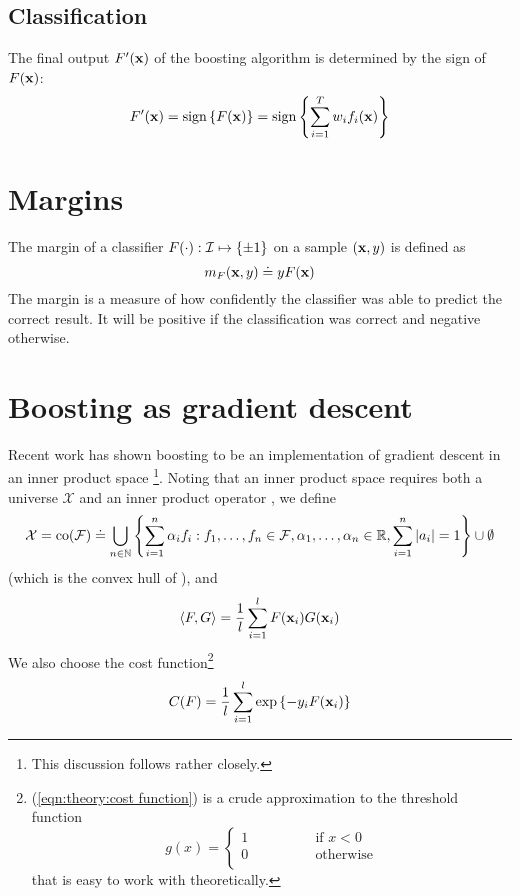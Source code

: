 \subsection{Classification}
The final output $F'(\mathbf{x})$ of the boosting algorithm is determined by
the sign of $F(\mathbf{x})$:
\begin{equation}
F'(\mathbf{x}) = \mathrm{sign} \left\{ F(\mathbf{x}) \right\} = \mathrm{sign} \left\{ \sum_{i=1}^T
w_i f_i(\mathbf{x}) \right\}
\label{eqn:output}
\end{equation}

\section{Margins}

The margin of a classifier $F(\cdot) : \mathcal{I} \mapsto \{\pm 1\}$ on a
sample $(\mathbf{x}, y)$ is defined as
%
\begin{equation}
m_F(\mathbf{x}, y) \doteq y F(\mathbf{x})
\end{equation}
%
The margin is a measure of how confidently the classifier was able to
predict the correct result.  It will be positive if the classification
was correct and negative otherwise.

\section{Boosting as gradient descent}
\label{sec:theory:gradient descent}

Recent work has
shown boosting to be an implementation of gradient descent in an inner
product space \cite{Mason99}\footnote{This discussion follows
\cite{Mason99} rather closely.}.
Noting that an inner product space requires both a universe
$\mathcal{X}$ and an inner product operator \ip{\cdot}{\cdot}, we
define
%
\begin{equation}
\mathcal{X} = 
\mathrm{co} (\mathcal{F}) \doteq
 \bigcup _{n \in \mathbb{N}}
\left\{
 \sum_{i=1}^{n}
 \alpha _i
f_i : f_1, \ldots, f_n \in \mathcal{F},
 \alpha _1, \ldots, \alpha _n \in \mathbb{R},
 \sum_{i=1}^{n} | a_i | = 1
\right\} \cup \emptyset
\end{equation}
%
(which is the convex hull of \calF), and
%
\begin{equation}
\langle {F} , {G} \rangle = \frac{1}{l} \sum_{i=1}^{l} F(\mathbf{x}_i)G(\mathbf{x}_i)
\end{equation}
%
We also choose the cost function\footnote{(\ref{eqn:theory:cost
function}) is a crude approximation to the threshold function 
\[ g(x) = \left\{ \begin{array}{ll}
1 \qquad \qquad & \mbox{if $x<0$} \\
0		& \mbox{otherwise} \\
\end{array} \right. \]
that is easy to work with theoretically.}
%
\begin{equation}
C(F) = \frac{1}{l} \sum_{i=1}^{l} \exp
\left\{ -y_i F(\mathbf{x}_i) \right\}
\label{eqn:theory:cost function}
\end{equation}

